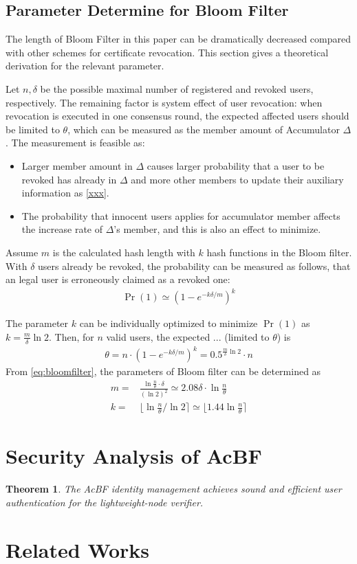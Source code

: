 \documentclass{IEEEconf}
\newtheorem{theorem}{Theorem}
\begin{document}
\subsection{Parameter Determine for Bloom Filter}

The length of Bloom Filter in this paper can be dramatically decreased compared with other schemes for certificate revocation. This section gives a theoretical derivation for the relevant parameter.

Let $n, \delta$ be the possible maximal number of registered and revoked users, respectively. The remaining factor is system effect of user revocation: when revocation is executed in one consensus round, the expected affected users should be limited to $\theta$, which can be measured as the member amount of Accumulator $\Delta$. The measurement is feasible as:
\begin{itemize}
    \item Larger member amount in $\Delta$ causes larger probability that a user to be revoked has already in $\Delta$ and more other members to update their auxiliary information as \eqref{xxx}.
    \item The probability that innocent users applies for accumulator member affects the increase rate of $\Delta$'s member, and this is also an effect to minimize.
\end{itemize}

Assume $m$ is the calculated hash length with $k$ hash functions in the Bloom filter. With $\delta$ users already be revoked, the probability can be measured as follows, that an legal user is erroneously claimed as a revoked one: 
\begin{align} 
    \Pr(1) \simeq (1 - e^{-k\delta/m})^k 
 \end{align}

The parameter $k$ can be individually optimized to minimize $\Pr(1)$ as $ k = \frac{m}{\delta}\ln 2$. Then, for $n$ valid users, the expected ... (limited to $\theta$) is 
\begin{align}\label{eq:bloomfilter}
    \theta = n \cdot (1 - e^{-k\delta/m})^{k} = 0.5^{\frac{m}{\delta}\ln 2}\cdot n
\end{align}
From \eqref{eq:bloomfilter}, the parameters of Bloom filter can be determined as 
\begin{align}
m = & \frac{\ln \frac{n}{\theta} \cdot \delta}{(\ln 2)^2} \simeq 2.08\delta \cdot\ln \frac{n}{\theta}\\
k = & \lfloor \ln \frac{n}{\theta} / \ln 2 \rceil \simeq \lfloor 1.44 \ln \frac{n}{\theta} \rceil
\end{align}

\section{Security Analysis of AcBF}
\begin{theorem}
	The AcBF identity management achieves sound and efficient user authentication for the lightweight-node verifier.
\end{theorem}
\section{Related Works}
\end{document}
